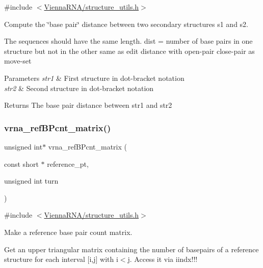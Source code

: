 {\ttfamily \#include $<$\hyperlink{structure__utils_8h}{Vienna\+R\+N\+A/structure\+\_\+utils.\+h}$>$}



Compute the \char`\"{}base pair\char`\"{} distance between two secondary structures s1 and s2. 

The sequences should have the same length. dist = number of base pairs in one structure but not in the other same as edit distance with open-\/pair close-\/pair as move-\/set


\begin{DoxyParams}{Parameters}
{\em str1} & First structure in dot-\/bracket notation \\
\hline
{\em str2} & Second structure in dot-\/bracket notation \\
\hline
\end{DoxyParams}
\begin{DoxyReturn}{Returns}
The base pair distance between str1 and str2 
\end{DoxyReturn}
\mbox{\label{group__struct__utils_gab4c2a00c99ce1d612ffa5bde114eb96d}} 
\subsubsection{\texorpdfstring{vrna\+\_\+ref\+B\+Pcnt\+\_\+matrix()}{vrna\_refBPcnt\_matrix()}}
{\footnotesize\ttfamily unsigned int$\ast$ vrna\+\_\+ref\+B\+Pcnt\+\_\+matrix (\begin{DoxyParamCaption}\item[{const short $\ast$}]{reference\+\_\+pt,  }\item[{unsigned int}]{turn }\end{DoxyParamCaption})}



{\ttfamily \#include $<$\hyperlink{structure__utils_8h}{Vienna\+R\+N\+A/structure\+\_\+utils.\+h}$>$}



Make a reference base pair count matrix. 

Get an upper triangular matrix containing the number of basepairs of a reference structure for each interval \mbox{[}i,j\mbox{]} with i$<$j. Access it via iindx!!! \mbox{\label{group__struct__utils_ga5a27bd058183170afd4716f5b8ff511a}} 
